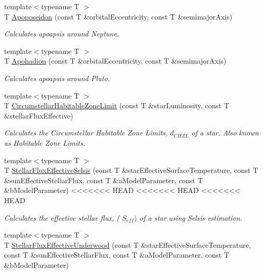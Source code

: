 \begin{DoxyCompactItemize}
{\footnotesize template$<$typename T $>$ }\\T \hyperlink{group___apoapsis_ga89679654fff13176e989536163a27f9d}{Apoposeidon} (const T \&orbital\+Eccentricity, const T \&semimajor\+Axis)
\begin{DoxyCompactList}\small\item\em Calculates apoapsis around Neptune. \end{DoxyCompactList}\item 
{\footnotesize template$<$typename T $>$ }\\T \hyperlink{group___apoapsis_gaa16847ddc5763c327067075dcb6a3353}{Apohadion} (const T \&orbital\+Eccentricity, const T \&semimajor\+Axis)
\begin{DoxyCompactList}\small\item\em Calculates apoapsis around Pluto. \end{DoxyCompactList}\item 
{\footnotesize template$<$typename T $>$ }\\T \hyperlink{group___astrophysics_ga23a8f602461ea3257e8767b1d455c383}{Circumstellar\+Habitable\+Zone\+Limit} (const T \&star\+Luminosity, const T \&stellar\+Flux\+Effective)
\begin{DoxyCompactList}\small\item\em Calculates the Circumstellar Habitable Zone Limits, $d_{CHZL}$ of a star. Also known as Habitable Zone Limits. \end{DoxyCompactList}\item 
{\footnotesize template$<$typename T $>$ }\\T \hyperlink{group___astrophysics_ga3ce3a04fec7b1c8fb66ac54270ce3902}{Stellar\+Flux\+Effective\+Selsis} (const T \&star\+Effective\+Surface\+Temperature, const T \&sun\+Effective\+Stellar\+Flux, const T \&a\+Model\+Parameter, const T \&b\+Model\+Parameter)
<<<<<<< HEAD
<<<<<<< HEAD
<<<<<<< HEAD
\begin{DoxyCompactList}\small\item\em Calculates the effective stellar flux, ( $S_{eff})$ of a star using Selsis estimation. \end{DoxyCompactList}\item 
{\footnotesize template$<$typename T $>$ }\\T \hyperlink{group___astrophysics_ga34d1e39bce17904bc6d383f1935c79d6}{Stellar\+Flux\+Effective\+Underwood} (const T \&star\+Effective\+Surface\+Temperature, const T \&sun\+Effective\+Stellar\+Flux, const T \&a\+Model\+Parameter, const T \&b\+Model\+Parameter)

\end{DoxyCompactItemize}
